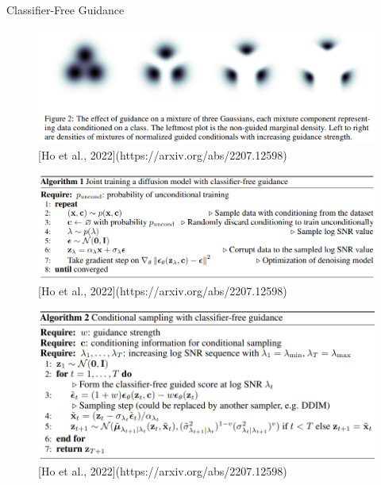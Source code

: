 \begin{frame}[allowframebreaks]{Classifier-Free Guidance}
    \framebreak

    \begin{figure}
        \centering
        \includegraphics[width=\linewidth,height=\textheight,keepaspectratio]{images/adv-img-gen/classifier-free-guidance-2.png}
        \caption*{[Ho et al., 2022](https://arxiv.org/abs/2207.12598)}
    \end{figure}

    \framebreak

    \begin{figure}
        \centering
        \includegraphics[width=\linewidth,height=\textheight,keepaspectratio]{images/adv-img-gen/classifier-free-guidance-3.png}
        \caption*{[Ho et al., 2022](https://arxiv.org/abs/2207.12598)}
    \end{figure}

    \framebreak

    \begin{figure}
        \centering
        \includegraphics[width=\linewidth,height=\textheight,keepaspectratio]{images/adv-img-gen/classifier-free-guidance-4.png}
        \caption*{[Ho et al., 2022](https://arxiv.org/abs/2207.12598)}
    \end{figure}


\end{frame}
